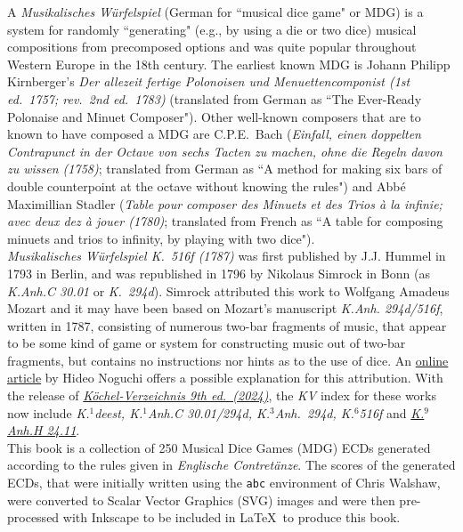 \documentclass[letterpaper,x11names,svgnames,10pt]{article}
\begin{document}
A {\it Musikalisches W\"{u}rfelspiel} (German for ``musical dice game" or MDG) is a system for randomly ``generating" (e.g., by using a die or two dice) musical compositions from precomposed options and was quite popular throughout Western Europe in the 18th century.  The earliest known MDG is Johann Philipp Kirnberger's {\em Der allezeit fertige Polonoisen und Menuettencomponist (1st ed.\ 1757; rev.\ 2nd ed.\ 1783)} (translated from German as ``The Ever-Ready Polonaise and Minuet Composer").  Other well-known composers that are to known to have composed a MDG are C.P.E.\ Bach ({\em Einfall, einen doppelten Contrapunct in der Octave von sechs Tacten zu machen, ohne die Regeln davon zu wissen (1758)}; translated from German as ``A method for making six bars of double counterpoint at the octave without knowing the rules") and Abb\'{e} Maximillian Stadler ({\em Table pour composer des Minuets et des Trios \`{a} la infinie; avec deux dez \`{a} jouer (1780)}; translated from French as ``A table for composing minuets and trios to infinity, by playing with two dice"). \\

{\it Musikalisches W\"{u}rfelspiel K.\ 516f (1787)} was first published by J.J. Hummel in 1793 in Berlin, and was republished in 1796 by Nikolaus Simrock in Bonn (as {\it K.Anh.C 30.01} or {\it K.\ 294d}).  Simrock attributed this work to Wolfgang Amadeus Mozart and it may have been based on Mozart's manuscript {\it K.Anh. 294d/516f}, written in 1787, consisting of numerous two-bar fragments of music, that appear to be some kind of game or system for constructing music out of two-bar fragments, but contains no instructions nor hints as to the use of dice.  An \href{(http://www.asahi-net.or.jp/\~rb5h-ngc/e/k516f.htm}{online article} by Hideo Noguchi offers a possible explanation for this attribution. With the release of \href{https://kv.mozarteum.at/en}{\it K\"{o}chel-Verzeichnis 9th ed.\ (2024)}, the {\it KV} index for these works now include {\it K.$^1$deest, K.$^1$Anh.C 30.01/294d, K.$^3$Anh.\ 294d, K.$^6$516f} and \href{https://kv.mozarteum.at/en/work/musikalisches-alphabet-6025}{\it K.$^9$Anh.H 24.11}. \\

This book is a collection of 250 Musical Dice Games (MDG) ECDs generated according to the rules given in {\it Englische Contret\"{a}nze}.  The scores of the generated ECDs, that were initially written using the \texttt{abc} environment of Chris Walshaw, were converted to Scalar Vector Graphics (SVG) images and were then pre-processed with Inkscape to be included in \LaTeX\ to produce this book.
\end{document}
